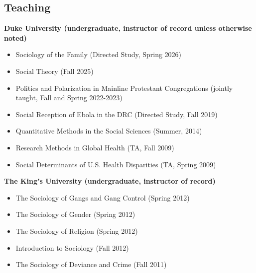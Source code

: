 \subsection*{Teaching}
\textbf{Duke University (undergraduate, instructor of record unless otherwise noted)}
\begin{itemize}
	\item Sociology of the Family (Directed Study, Spring 2026)
	\item Social Theory (Fall 2025)
	\item Politics and Polarization in Mainline Protestant Congregations (jointly taught, Fall and Spring 2022-2023)
	\item Social Reception of Ebola in the DRC (Directed Study, Fall 2019)
	\item Quantitative Methods in the Social Sciences (Summer, 2014)
	\item Research Methods in Global Health (TA, Fall 2009)
	\item Social Determinants of U.S. Health Disparities (TA, Spring 2009)
\end{itemize}

\vspace{1em}
\textbf{The King's University (undergraduate, instructor of record)}
\begin{itemize}
	\item The Sociology of Gangs and Gang Control (Spring 2012)
	\item The Sociology of Gender (Spring 2012)
	\item The Sociology of Religion (Spring 2012)
	\item Introduction to Sociology (Fall 2012)
	\item The Sociology of Deviance and Crime (Fall 2011)
\end{itemize}

